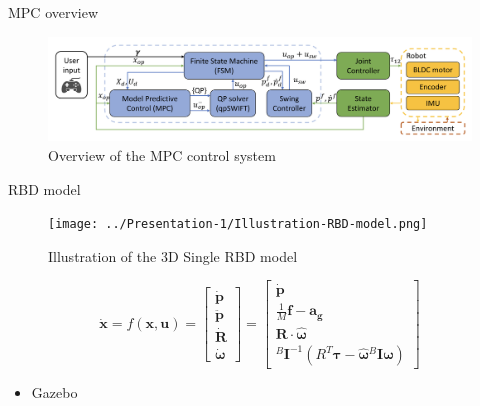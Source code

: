 \documentclass{beamer}
\begin{document}
\begin{frame}{MPC overview}
\begin{figure}
    \centering
    \includegraphics[width=\linewidth]{Presentation-2/rf-mpc-flow.png}
    \caption{Overview of the MPC control system}
\end{figure}
\end{frame}

\begin{frame}{RBD model}
\begin{figure}
    \centering
    \texttt{[image: ../Presentation-1/Illustration-RBD-model.png]}
    \caption{Illustration of the 3D Single RBD model}
    \label{fig:rbd-model}
\end{figure}
\begin{equation*}
    \mathbf{\dot{x}} = f(\mathbf{x}, \mathbf{u}) = 
    \begin{bmatrix}
    \mathbf{\dot{p}} \\
    \mathbf{\ddot{p}} \\
    \mathbf{\dot{R}} \\
    \boldsymbol{\dot{\omega}}
    \end{bmatrix}
    =
    \begin{bmatrix}
    \mathbf{\dot{p}} \\
    \frac{1}{M} \mathbf{f} - \mathbf{a_g} \\
    \mathbf{R} \cdot \hat{\boldsymbol{\omega}} \\
    {}^{B} \mathbf{I}^{-1}(R^T \boldsymbol{\tau} - \hat{\boldsymbol{\omega}} {}^{B} \mathbf{I} \boldsymbol{\omega})
    \end{bmatrix}
\end{equation*}
\begin{itemize}
    \item Gazebo
\end{itemize}
\end{frame}
\end{document}
